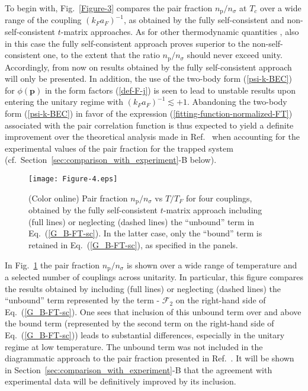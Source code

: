 \documentclass[pra,twocolumn,aps,amssymb,showpacs,superscriptaddress]{revtex4-1}
\begin{document}
To begin with, Fig.~\ref{Figure-3} compares the pair fraction $n_{\mathrm{p}}/n_{\sigma}$ at $T_{c}$ over a wide range of the coupling $(k_{F} a_{F})^{-1}$, as obtained by
the fully self-consistent and non-self-consistent $t$-matrix approaches. 
As for other thermodynamic quantities \cite{PPS-2019}, also in this case the fully self-consistent approach proves superior to the non-self-consistent one, to the extent that the ratio $n_{\mathrm{p}}/n_{\sigma}$
should never exceed unity.
Accordingly, from now on results obtained by the fully self-consistent approach will only be presented. 
In addition, the use of the two-body form (\ref{psi-k-BEC}) for $\phi(\mathbf{p})$ in the form factors (\ref{def-F-j}) is seen to lead to unstable results upon entering the unitary regime with $(k_{F} a_{F})^{-1} \lesssim +1$.
Abandoning the two-body form (\ref{psi-k-BEC}) in favor of the expression (\ref{fitting-function-normalized-FT}) associated with the pair correlation function is thus expected to yield a definite improvement over the
theoretical analysis made in Ref.~\cite{Ulm-Cam-2019} when accounting for the experimental values of the pair fraction for the trapped system (cf.~Section~\ref{sec:comparison_with_experiment}-B below).

\begin{figure}[t]
\begin{center}
\texttt{[image: Figure-4.eps]}
\caption{(Color online) Pair fraction $n_{\mathrm{p}}/n_{\sigma}$ vs $T/T_{F}$ for four couplings, obtained by the fully self-consistent $t$-matrix approach including (full lines) 
                                    or neglecting (dashed lines) the ``unbound'' term in Eq.~(\ref{G_B-FT-sc}). In the latter case, only the ``bound'' term is retained in Eq.~(\ref{G_B-FT-sc}), as specified in the panels.}
\label{Figure-4} 
\end{center}
\end{figure} 


In Fig.~\ref{Figure-4} the pair fraction $n_{\mathrm{p}}/n_{\sigma}$ is shown over a wide range of temperature and a selected number of couplings across unitarity.
In particular, this figure compares the results obtained by including (full lines) or neglecting (dashed lines) the ``unbound'' term represented by the term - $\mathcal{F}_{2}$ on the right-hand side of Eq.~(\ref{G_B-FT-sc}).
One sees that inclusion of this unbound term over and above the bound term (represented by the second term on the right-hand side of Eq.~(\ref{G_B-FT-sc})) leads to substantial differences, especially in the unitary regime at low temperature.
The unbound term was not included in the diagrammatic  approach to the pair fraction presented in Ref.~\cite{Ulm-Cam-2019}.
It will be shown in Section~\ref{sec:comparison_with_experiment}-B that the agreement with experimental data will be definitively improved by its inclusion.
\end{document}
